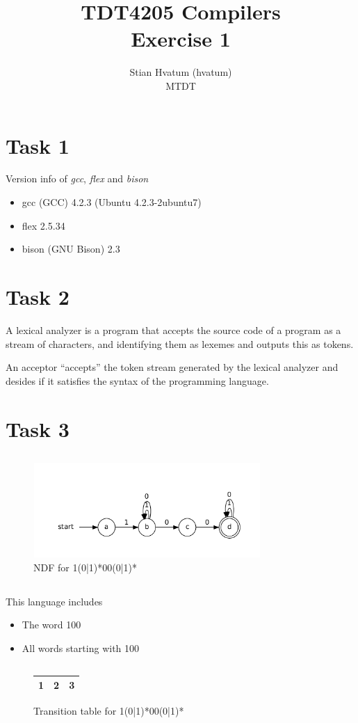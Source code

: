 \documentclass{article}
\title{TDT4205 Compilers\\
\Huge Exercise 1}
\author{Stian Hvatum (hvatum)\\MTDT}
\begin{document}
\maketitle

\section{Task 1}
Version info of \emph{gcc}, \emph{flex} and \emph{bison}
\begin{itemize}
  \item gcc (GCC) 4.2.3 (Ubuntu 4.2.3-2ubuntu7)
  \item flex 2.5.34
  \item bison (GNU Bison) 2.3
\end{itemize}


\section{Task 2}
A lexical analyzer is a program that accepts the source code of a program as a
stream of characters, and identifying them as lexemes and outputs this as
tokens.

An acceptor ``accepts'' the token stream generated by the lexical analyzer
and desides if it satisfies the syntax of the programming language.
\newpage
\section{Task 3}
\subsection{}
\begin{figure}[h]
\includegraphics[width=327px, height=136px]{NDF.pdf}
\caption{NDF for 1(0|1)*00(0|1)*}
\end{figure}

\subsection{}
This language includes
\begin{itemize}
  \item The word 100
  \item All words starting with 100
\end{itemize}



\subsection{}
\begin{figure}[h]
\begin{tabular}{|l|c|r|}
\hline
1 & 2 & 3 \\
\hline
\end{tabular}
\caption{Transition table for 1(0|1)*00(0|1)*}
\end{figure}
\end{document}
